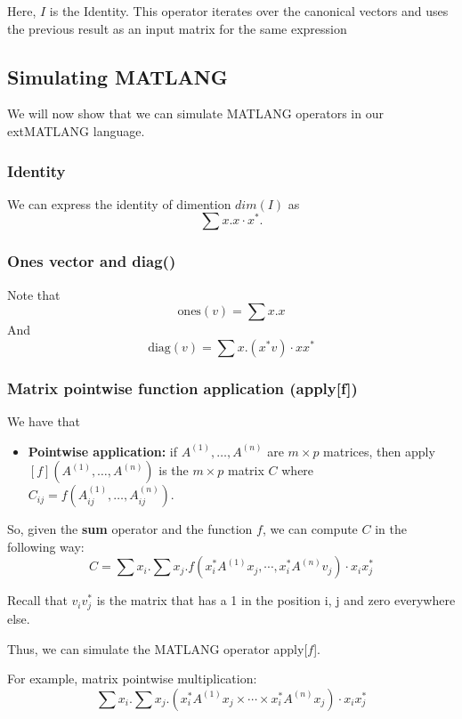 Here, $I$ is the Identity. This operator iterates over the canonical vectors and uses the previous result as an input matrix for the same expression

\subsection{Simulating MATLANG}

We will now show that we can simulate MATLANG operators in our extMATLANG language.

\subsubsection{Identity}

We can express the identity of dimention $dim(I)$ as $$\sum x. x\cdot x^*.$$

\subsubsection{Ones vector and diag()}

Note that $$\text{ones}(v)=\sum x. x$$ And $$\text{diag}(v)=\sum x. (x^*v)\cdot xx^*$$

\subsubsection{Matrix pointwise function application (apply[f])}

We have that 

\begin{itemize}
	\item \textbf{Pointwise application:} if $A^{(1)}, \ldots, A^{(n)}$ are $m\times p$ matrices, then apply$\left[ f \right](A^{(1)}, \ldots, A^{(n)})$ is the $m\times p$ matrix $C$ where $C_{ij}=f(A^{(1)}_{ij}, \ldots, A^{(n)}_{ij})$.
\end{itemize}

So, given the \textbf{sum} operator and the function $f$, we can compute $C$ in the following way: $$C=\sum x_i.\sum x_j. f\left( x_i^*A^{(1)}x_j, \cdots, x_i^*A^{(n)}v_j\right)\cdot x_ix_j^*$$

Recall that $v_iv_j^*$ is the matrix that has a 1 in the position i, j and zero everywhere else.

Thus, we can simulate the MATLANG operator apply[$f$].

For example, matrix pointwise multiplication: $$\sum x_i.\sum x_j.\left( x_i^*A^{(1)}x_j\times \cdots\times x_i^*A^{(n)}x_j\right)\cdot x_ix_j^*$$

